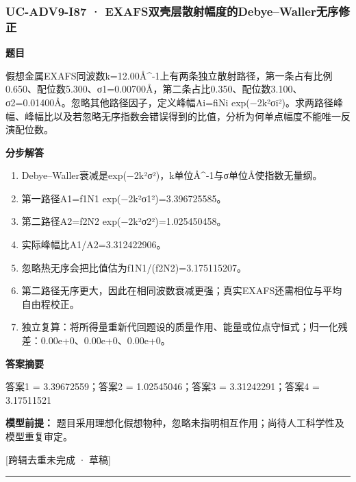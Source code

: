 \documentclass[UTF8,11pt,a4paper]{ctexart}
\begin{document}
\subsubsection*{UC-ADV9-I87 · EXAFS双壳层散射幅度的Debye–Waller无序修正}
\noindent\textbf{题目}\par
假想金属EXAFS同波数k=12.00Å\textasciicircum{}-1上有两条独立散射路径，第一条占有比例0.650、配位数5.300、σ1=0.00700Å，第二条占比0.350、配位数3.100、σ2=0.01400Å。忽略其他路径因子，定义峰幅Ai=fiNi exp(−2k²σi²)。求两路径峰幅、峰幅比以及若忽略无序指数会错误得到的比值，分析为何单点幅度不能唯一反演配位数。\par
\medskip\noindent\textbf{分步解答}
\begin{enumerate}
\item Debye–Waller衰减是exp(−2k²σ²)，k单位Å\textasciicircum{}-1与σ单位Å使指数无量纲。
\item 第一路径A1=f1N1 exp(−2k²σ1²)=3.396725585。
\item 第二路径A2=f2N2 exp(−2k²σ2²)=1.025450458。
\item 实际峰幅比A1/A2=3.312422906。
\item 忽略热无序会把比值估为f1N1/(f2N2)=3.175115207。
\item 第二路径无序更大，因此在相同波数衰减更强；真实EXAFS还需相位与平均自由程校正。
\item 独立复算：将所得量重新代回题设的质量作用、能量或位点守恒式；归一化残差：0.00e+0、0.00e+0、0.00e+0。
\end{enumerate}
\noindent\textbf{答案摘要}\par
答案1 = 3.39672559；答案2 = 1.02545046；答案3 = 3.31242291；答案4 = 3.17511521\par
\noindent\textbf{模型前提：}
题目采用理想化假想物种，忽略未指明相互作用；尚待人工科学性及模型重复审定。\par
\noindent\textcolor{red!65!black}{[跨辑去重未完成 · 草稿]} \par
\medskip\hrule\medskip
{}
\end{document}
